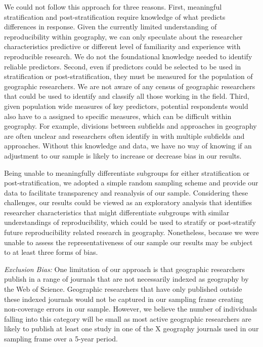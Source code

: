 \documentclass[]{interact}
\theoremstyle{plain}%
\theoremstyle{definition}
\theoremstyle{remark}
\begin{document}
We could not follow this approach for three reasons. 
First, meaningful stratification and post-stratification require knowledge of what predicts differences in response.
Given the currently limited understanding of reproducibility within geography, we can only speculate about the researcher characteristics predictive or different level of familiarity and experience with reproducible research. 
We do not the foundational knowledge needed to identify reliable predictors.   
Second, even if predictors could be selected to be used in stratification or post-stratification, they must be measured for the population of geographic researchers.
We are not aware of any census of geographic researchers that could be used to identify and classify all those working in the field.
Third, given population wide measures of key predictors, potential respondents would also have to a assigned to specific measures, which can be difficult within geography.
For example, divisions between subfields and approaches in geography are often unclear and researchers often identify in with multiple subfields and approaches. 
Without this knowledge and data, we have no way of knowing if an adjustment to our sample is likely to increase or decrease bias in our results.   

Being unable to meaningfully differentiate subgroups for either stratification or post-stratification, we adopted a simple random sampling scheme and provide our data to facilitate transparency and reanalysis of our sample.
Considering these challenges, our results could be viewed as an exploratory analysis that identifies researcher characteristics that might differentiate subgroups with similar understandings of reproducibility, which could be used to stratify or post-stratify future reproducibility related research in geography.
Nonetheless, because we were unable to assess the representativeness of our sample our results may be subject to at least three forms of bias. 

\textit{Exclusion Bias:} One limitation of our approach is that geographic researchers publish in a range of journals that are not necessarily indexed as geography by the Web of Science. 
Geographic researchers that have only published outside these indexed journals would not be captured in our sampling frame creating non-coverage errors in our sample. 
However, we believe the number of individuals falling into this category will be small as most active geographic researchers are likely to publish at least one study in one of the X geography journals used in our sampling frame over a 5-year period.
\end{document}

